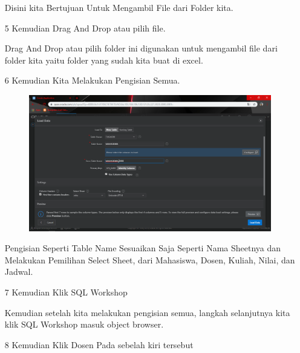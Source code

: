 \begin{enumerate}
\par
Disini kita Bertujuan Untuk Mengambil File dari Folder kita.

\newpage
\item[5]Kemudian Drag And Drop atau pilih file.

\par
Drag And Drop atau pilih folder ini digunakan untuk mengambil file dari folder kita yaitu folder yang sudah kita buat di excel.

\item[6]Kemudian Kita Melakukan Pengisian Semua.

\begin{figure}[!htbp]
    \begin{center}
    \includegraphics[scale=0.3]{figures/2.png}
    \end{center}   
    \end{figure}

\par
Pengisian Seperti Table Name Sesuaikan Saja Seperti Nama Sheetnya dan Melakukan Pemilihan Select Sheet, dari Mahasiswa, Dosen, Kuliah, Nilai, dan Jadwal.

\item[7]Kemudian Klik SQL Workshop
    
\par
Kemudian setelah kita melakukan pengisian semua, langkah selanjutnya kita klik SQL Workshop masuk object browser.

\item[8]Kemudian Klik Dosen Pada sebelah kiri tersebut


\end{enumerate}
